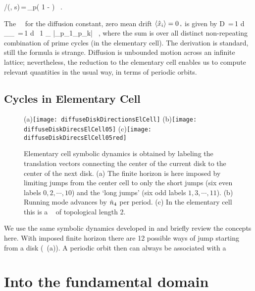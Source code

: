 \documentclass[aps,pre,showpacs,preprint,groupedaddress,floatfix]{revtex4-1}
\begin{document}
/\zeta(\beta, s)\,=\,\prod_{p}\left( 1 -  \right) ~.
\label{zeta-diff}
\eeq 

The \dzeta\ \cycForm\ for the diffusion constant, zero mean drift
$ \left\langle { \hat{x}_i } \right\rangle = 0 \,, $ is given by
 \beq D \,=\,{1  d}
{ _\zeta \over \expct{\period{}}_\zeta } \,=\,{1
   d } \, {1 \over \expct{\period{}}_\zeta} \sumprime
{}
{|\ExpaEig_{p_1}\cdots \ExpaEig_{p_k}|} \, ,
\label{(17)}
\eeq 
where the sum is over all distinct non-repeating combination of
prime cycles (in the elementary cell). The derivation is standard,
still the formula is strange. Diffusion is unbounded motion across an
infinite lattice; nevertheless, the reduction to the elementary cell
enables us to compute relevant quantities in the usual way, in terms
of periodic orbits.

\subsection{Cycles in Elementary Cell}
\begin{figure}
  \begin{center}
    (a)\texttt{[image: diffuseDiskDirectionsElCell]}
    (b)\texttt{[image: diffuseDiskDirecsElCell05]}
    (c)\texttt{[image: diffuseDiskDirecsElCell05red]}
  \end{center}
  \caption{ Elementary cell symbolic dynamics is obtained by labeling
    the translation vectors connecting the center of the current disk
    to the center of the next disk. (a) The finite horizon is here
    imposed by limiting jumps from the center cell to only the short
    jumps (six even labels $0, 2,\cdots,10$) and the `long jumps' (six
    odd labels $1, 3,\cdots,11$). (b) Running mode  advances
    by $\hat n_4$ per period. (c) In the elementary cell this is a \po\
     of topological length 2.  }
  \label{fig-diskDirectionsElCell}
\end{figure}



We use the same symbolic dynamics developed in  and
briefly review the concepts here. With imposed finite horizon there
are 12 possible ways of jump starting from a disk (~(a)). A periodic orbit then can always be associated with a 


\section{Into the fundamental domain\label{s-SymmetryReduction} }
\end{document}
